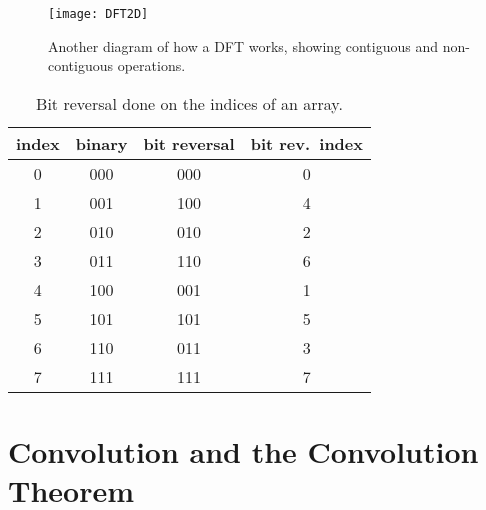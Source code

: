             \begin{figure}[htbp!]
                \begin{center}
                    \texttt{[image: DFT2D]}
                \end{center}
                \caption{Another diagram of how a DFT works, showing contiguous and
                non-contiguous operations.}
                \label{fig:DFT2D}
            \end{figure}

            \begin{table}[htbp!]
                \begin{center}
                    \caption{Bit reversal done on the indices of an array.}
                    \label{tab:bitreversal}
                    \begin{tabular}{|c|c|c|c|}
                        \hline
                        index & binary & bit reversal & bit rev.\ index \\
                        \hline
                        0 & 000 & 000 & 0 \\
                        1 & 001 & 100 & 4 \\
                        2 & 010 & 010 & 2 \\
                        3 & 011 & 110 & 6 \\
                        4 & 100 & 001 & 1 \\
                        5 & 101 & 101 & 5 \\
                        6 & 110 & 011 & 3 \\
                        7 & 111 & 111 & 7 \\
                        \hline
                    \end{tabular}
                \end{center}
            \end{table}



            \section{Convolution and the Convolution Theorem}

